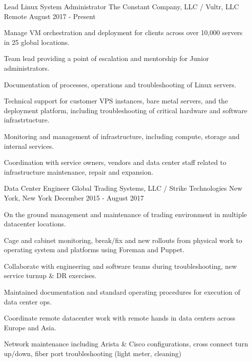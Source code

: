 
\begin{cventries}

	\cventry
	{Lead Linux System Administrator}
	{The Constant Company, LLC / Vultr, LLC}
	{Remote}
	{August 2017 - Present}
	{
		\begin{cvitems}
		\item {Manage VM orchestration and deployment for clients across over 10,000 servers in 25 global locations.}
		\item {Team lead providing a point of escalation and mentorship for Junior administrators.}
		\item {Documentation of processes, operations and troubleshooting of Linux servers.}
		\item {Technical support for customer VPS instances, bare metal servers, and the deployment platform, including troubleshooting of critical hardware and software infrastrtucture.}
		\item {Monitoring and management of infrastructure, including compute, storage and internal services.}
		\item {Coordination with service owners, vendors and data center staff related to infrastructure maintenance, repair and expansion.}
		\end{cvitems}
	}


	\cventry
	{Data Center Engineer}
	{Global Trading Systems, LLC / Strike Technologies}
	{New York, New York}
	{December 2015 - August 2017}
	{
		\begin{cvitems}
		\item {On the ground management and maintenance of trading environment in multiple datacenter locations.}
		\item {Cage and cabinet monitoring, break/fix and new rollouts from physical work to operating system and platforms using Foreman and Puppet.}
		\item {Collaborate with engineering and software teams during troubleshooting, new service turnup & DR exercises.}
		\item {Maintained documentation and standard operating procedures for execution of data center ops.}
		\item {Coordinate remote datacenter work with remote hands in data centers across Europe and Asia.}
		\item {Network maintenance including Arista & Cisco configurations, cross connect turn up/down, fiber port troubleshooting (light meter, cleaning)}
		\end{cvitems}
	}


\end{cventries}
